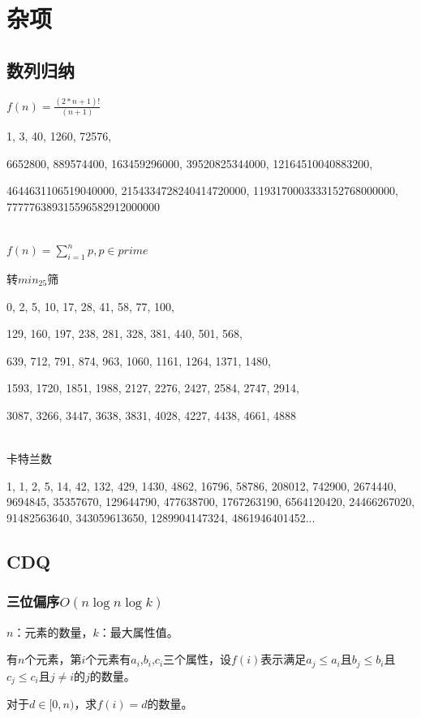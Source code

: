 \documentclass[twoside,a4paper]{article}
\begin{document}
\section{杂项}

\subsection{数列归纳}

$f(n) = \frac{(2*n + 1)!}{(n + 1)}$\par
1, 3, 40, 1260, 72576, \par
6652800, 889574400, 163459296000, 39520825344000, 12164510040883200, \par
4644631106519040000, 2154334728240414720000, 1193170003333152768000000, 777776389315596582912000000\par

~\\

$f(n) = \sum_{i=1}^{n} p, p \in prime$\par
转$min_25筛$\par
0, 2, 5, 10, 17, 28, 41, 58, 77, 100, \par
129, 160, 197, 238, 281, 328, 381, 440, 501, 568, \par
639, 712, 791, 874, 963, 1060, 1161, 1264, 1371, 1480, \par
1593, 1720, 1851, 1988, 2127, 2276, 2427, 2584, 2747, 2914, \par
3087, 3266, 3447, 3638, 3831, 4028, 4227, 4438, 4661, 4888\par
\par

~\\

卡特兰数\par
1, 1, 2, 5, 14, 42, 132, 429, 1430, 4862, 16796, 58786, 208012, 742900, 2674440, 9694845, 35357670, 129644790, 477638700, 1767263190, 6564120420, 24466267020, 91482563640, 343059613650, 1289904147324, 4861946401452...


\subsection{CDQ}
\subsubsection{三位偏序$O(n \log n \log k)$}
$n$：元素的数量，$k$：最大属性值。\par
有$n$个元素，第$i$个元素有$a_i$,$b_i$,$c_i$三个属性，设$f(i)$表示满足$a_j \leq a_i$且$b_j \leq b_i$且$c_j \leq c_i$且$j \ne i$的$j$的数量。\par
对于$d\in [0, n)$，求$f(i)=d$的数量。

\end{document}

